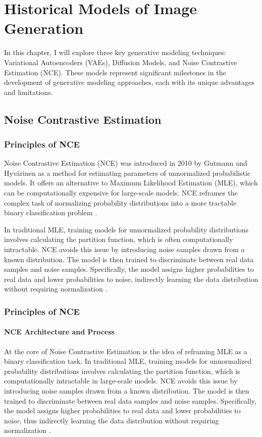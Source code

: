 \chapter{Historical Models of Image Generation}

In this chapter, I will explore three key generative modeling techniques: Variational Autoencoders (VAEs), Diffusion Models, and Noise Contrastive Estimation (NCE). These models represent significant milestones in the development of generative modeling approaches, each with its unique advantages and limitations. 

\section{Noise Contrastive Estimation}

\subsection{Principles of NCE}

Noise Contrastive Estimation (NCE) was introduced in 2010 by Gutmann and Hyvärinen as a method for estimating parameters of unnormalized probabilistic models. It offers an alternative to Maximum Likelihood Estimation (MLE), which can be computationally expensive for large-scale models. NCE reframes the complex task of normalizing probability distributions into a more tractable binary classification problem \citep{10.48550/arxiv.1711.00658}.

In traditional MLE, training models for unnormalized probability distributions involves calculating the partition function, which is often computationally intractable. NCE avoids this issue by introducing noise samples drawn from a known distribution. The model is then trained to discriminate between real data samples and noise samples. Specifically, the model assigns higher probabilities to real data and lower probabilities to noise, indirectly learning the data distribution without requiring normalization \citep{10.48550/arxiv.2110.11271}.
\subsection{Principles of NCE}
\subsubsection{NCE Architecture and Process}

At the core of Noise Contrastive Estimation is the idea of reframing MLE as a binary classification task. In traditional MLE, training models for unnormalized probability distributions involves calculating the partition function, which is computationally intractable in large-scale models. NCE avoids this issue by introducing noise samples drawn from a known distribution. The model is then trained to discriminate between real data samples and noise samples. Specifically, the model assigns higher probabilities to real data and lower probabilities to noise, thus indirectly learning the data distribution without requiring normalization \citep{10.48550/arxiv.2110.11271}.

